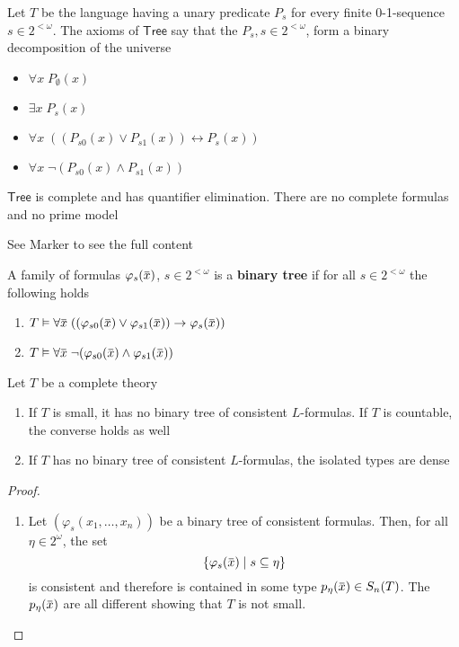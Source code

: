 \documentclass[11pt]{article}
\def \Tree {\textsf{Tree}}
\begin{document}
\begin{examplle}[]
Let \(T\) be the language having a unary predicate \(P_s\) for every finite
0-1-sequence \(s\in 2^{<\omega}\). The axioms of \(\Tree\) say that the \(P_s,s\in 2^{<\omega}\), form a
binary decomposition of the universe
\begin{itemize}
\item \(\forall x\;P_\emptyset(x)\)
\item \(\exists x\;P_s(x)\)
\item \(\forall x\;((P_{s0}(x)\vee P_{s1}(x))\leftrightarrow P_s(x))\)
\item \(\forall x\;\neg(P_{s0}(x)\wedge P_{s1}(x))\)
\end{itemize}


\(\Tree\) is complete and has quantifier elimination. There are no complete formulas and no
prime model
\end{examplle}


See Marker to see the full content
\begin{definition}[]
A family of formulas \(\varphi_s(\barx)\), \(s\in 2^{<\omega}\) is a \textbf{binary tree} if for all \(s\in 2^{<\omega}\) the
following holds
\begin{enumerate}
\item \(T\vDash\forall \barx\;((\varphi_{s0}(\barx)\vee\varphi_{s1}(\barx))\to\varphi_s(\barx))\)
\item \(T\vDash\forall\barx\;\neg(\varphi_{s0}(\barx)\wedge\varphi_{s1}(\barx))\)
\end{enumerate}
\end{definition}

\begin{theorem}[]
\label{thm4.5.9}
Let \(T\) be a complete theory
\begin{enumerate}
\item If \(T\) is small, it has no binary tree of consistent \(L\)-formulas. If \(T\) is countable,
the converse holds as well
\item If \(T\) has no binary tree of consistent \(L\)-formulas, the isolated types are dense
\end{enumerate}
\end{theorem}

\begin{proof}
\begin{enumerate}
\item Let \((\varphi_s(x_1,\dots,x_n))\) be a binary tree of consistent formulas. Then, for all \(\eta\in 2^\omega\),
the set
\begin{equation*}
\{\varphi_s(\barx)\mid s\subseteq\eta\}
\end{equation*}
is consistent and therefore is contained in some type \(p_{\eta}(\barx)\in S_n(T)\).
The \(p_\eta(\barx)\) are all different showing that \(T\) is not small.
\end{enumerate}
\end{proof}
\end{document}
